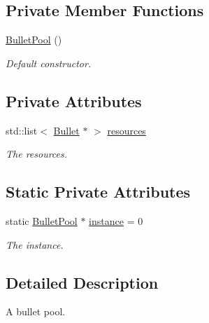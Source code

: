 \subsection*{Private Member Functions}
\begin{DoxyCompactItemize}
\item 
\hyperlink{class_bullet_pool_ae1984d57ec3240c837589db4d25939e6}{Bullet\-Pool} ()
\begin{DoxyCompactList}\small\item\em Default constructor. \end{DoxyCompactList}\end{DoxyCompactItemize}
\subsection*{Private Attributes}
\begin{DoxyCompactItemize}
\item 
std\-::list$<$ \hyperlink{class_bullet}{Bullet} $\ast$ $>$ \hyperlink{class_bullet_pool_a1edef8514952653237ee829a197fd040}{resources}
\begin{DoxyCompactList}\small\item\em The resources. \end{DoxyCompactList}\end{DoxyCompactItemize}
\subsection*{Static Private Attributes}
\begin{DoxyCompactItemize}
\item 
static \hyperlink{class_bullet_pool}{Bullet\-Pool} $\ast$ \hyperlink{class_bullet_pool_aac55f9e917420391431f394836222baf}{instance} = 0
\begin{DoxyCompactList}\small\item\em The instance. \end{DoxyCompactList}\end{DoxyCompactItemize}


\subsection{Detailed Description}
A bullet pool. 



 

 

